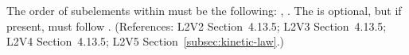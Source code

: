 The order of subelements within \KineticLaw must be the following:
, .  The  is
optional, but if present, must follow .  (References: L2V2
Section~4.13.5; L2V3 Section~4.13.5; L2V4 Section~4.13.5; L2V5 Section~\ref{subsec:kinetic-law}.)
